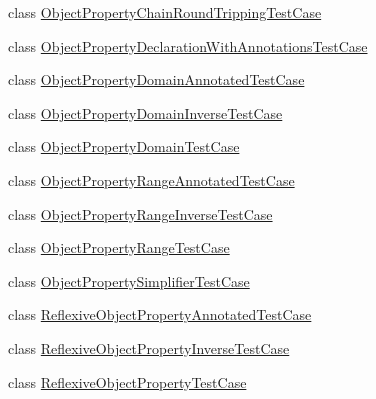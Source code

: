 \begin{DoxyCompactItemize}
\item 
class \hyperlink{classorg_1_1semanticweb_1_1owlapi_1_1api_1_1test_1_1objectproperties_1_1_object_property_chain_round_tripping_test_case}{Object\-Property\-Chain\-Round\-Tripping\-Test\-Case}
\item 
class \hyperlink{classorg_1_1semanticweb_1_1owlapi_1_1api_1_1test_1_1objectproperties_1_1_object_property_declaration_with_annotations_test_case}{Object\-Property\-Declaration\-With\-Annotations\-Test\-Case}
\item 
class \hyperlink{classorg_1_1semanticweb_1_1owlapi_1_1api_1_1test_1_1objectproperties_1_1_object_property_domain_annotated_test_case}{Object\-Property\-Domain\-Annotated\-Test\-Case}
\item 
class \hyperlink{classorg_1_1semanticweb_1_1owlapi_1_1api_1_1test_1_1objectproperties_1_1_object_property_domain_inverse_test_case}{Object\-Property\-Domain\-Inverse\-Test\-Case}
\item 
class \hyperlink{classorg_1_1semanticweb_1_1owlapi_1_1api_1_1test_1_1objectproperties_1_1_object_property_domain_test_case}{Object\-Property\-Domain\-Test\-Case}
\item 
class \hyperlink{classorg_1_1semanticweb_1_1owlapi_1_1api_1_1test_1_1objectproperties_1_1_object_property_range_annotated_test_case}{Object\-Property\-Range\-Annotated\-Test\-Case}
\item 
class \hyperlink{classorg_1_1semanticweb_1_1owlapi_1_1api_1_1test_1_1objectproperties_1_1_object_property_range_inverse_test_case}{Object\-Property\-Range\-Inverse\-Test\-Case}
\item 
class \hyperlink{classorg_1_1semanticweb_1_1owlapi_1_1api_1_1test_1_1objectproperties_1_1_object_property_range_test_case}{Object\-Property\-Range\-Test\-Case}
\item 
class \hyperlink{classorg_1_1semanticweb_1_1owlapi_1_1api_1_1test_1_1objectproperties_1_1_object_property_simplifier_test_case}{Object\-Property\-Simplifier\-Test\-Case}
\item 
class \hyperlink{classorg_1_1semanticweb_1_1owlapi_1_1api_1_1test_1_1objectproperties_1_1_reflexive_object_property_annotated_test_case}{Reflexive\-Object\-Property\-Annotated\-Test\-Case}
\item 
class \hyperlink{classorg_1_1semanticweb_1_1owlapi_1_1api_1_1test_1_1objectproperties_1_1_reflexive_object_property_inverse_test_case}{Reflexive\-Object\-Property\-Inverse\-Test\-Case}
\item 
class \hyperlink{classorg_1_1semanticweb_1_1owlapi_1_1api_1_1test_1_1objectproperties_1_1_reflexive_object_property_test_case}{Reflexive\-Object\-Property\-Test\-Case}

\end{DoxyCompactItemize}
